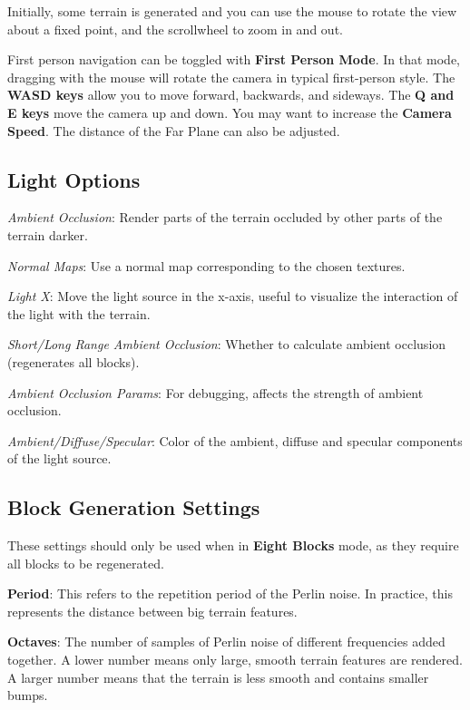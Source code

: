 \documentclass {article}
\begin{document}
Initially, some terrain is generated and you can use the mouse to rotate the view about a fixed point, and the scrollwheel to zoom in and out.

First person navigation can be toggled with \textbf{First Person Mode}. In that mode, dragging with the mouse will rotate the camera in typical first-person style. The \textbf{WASD keys} allow you to move forward, backwards, and sideways. The \textbf{Q and E keys} move the camera up and down. You may want to increase the \textbf{Camera Speed}. The distance of the Far Plane can also be adjusted.

\subsection{Light Options}

\textit{Ambient Occlusion}: Render parts of the terrain occluded by other parts of the terrain darker.

\textit{Normal Maps}: Use a normal map corresponding to the chosen textures.

\textit{Light X}: Move the light source in the x-axis, useful to visualize the interaction of the light with the terrain.

\textit{Short/Long Range Ambient Occlusion}: Whether to calculate ambient occlusion (regenerates all blocks).

\textit{Ambient Occlusion Params}: For debugging, affects the strength of ambient occlusion.

\textit{Ambient/Diffuse/Specular}: Color of the ambient, diffuse and specular components of the light source.

\subsection{Block Generation Settings}

These settings should only be used when in \textbf{Eight Blocks} mode, as they require all blocks to be regenerated.

\textbf{Period}: This refers to the repetition period of the Perlin noise. In practice, this represents the distance between big terrain features.

\textbf{Octaves}: The number of samples of Perlin noise of different frequencies added together. A lower number means only large, smooth terrain features are rendered. A larger number means that the terrain is less smooth and contains smaller bumps.
\end{document}
